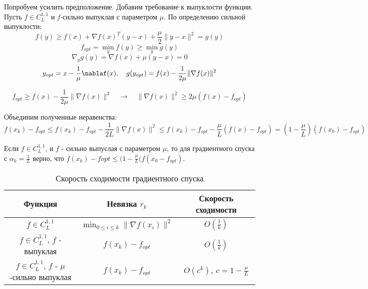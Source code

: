 \documentclass[a4paper, 12pt]{article}
\begin{document}
Попробуем усилить предположение. Добавим требование к выпуклости функции. Пусть $ f \in C^{1,1}_L$ и $f$-сильно выпуклая с параметром $\mu$. По определению сильной выпуклости:
$$ f(y) \geq f(x) + \nabla f(x)^T (y - x) + \frac{\mu}{2}\| y - x \|^2 = g(y)$$
$$f_{opt} = \min_y f(y) \geq \min_y g(y) $$
$$\nabla_y g(y) = \nabla f(x) + \mu(y - x) = 0$$
$$y_{opt} = x - \frac{1}{\mu}\nablaf(x), \quad g(y_{opt}) = f(x) - \frac{1}{2\mu} \| \nabla f(x) \|^2$$

$$f_{opt} \geq f(x) - \frac{1}{2\mu} \| \nabla f(x) \|^2 \quad \rightarrow \quad \| \nabla f(x) \|^2 \geq 2\mu(f(x) - f_{opt}) $$

Объединим полученные неравенства:
$$f(x_k) - f_{opt} \leq f(x_k) - f_{opt} - \frac{1}{2L} \| \nabla f(x) \|^2 \leq f(x_k) - f_{opt} - \frac{\mu}{L} (f(x) - f_{opt}) = (1 - \frac{\mu}{L})(f(x_0) - f_{opt})$$

\begin{Statement}
Если $ f \in C^{1,1}_L$, и $f$ - сильно выпуслая с параметром $\mu$, то для градиентного спуска с $\alpha_k = \frac{1}{L}$ верно, что $f(x_k) - f{opt} \leq (1 - \frac{\mu}{L}(f(x_0 - f_{opt})$.
\end{Statement}

\begin{table}[h]
    \centering
    \begin{tabular}{|c|c|c|} 
        \hline
        Функция & Невязка $r_k$ & Скорость сходимости\\
        \hline
        \hline
        $f \in C^{1,1}_L $ & $\min_{0\leq i \leq k}\|\nabla f(x_i)\|^2$& $O(\frac{1}{k})$\\
        \hline
        $f \in C^{1,1}_L$, $f$ - выпуклая & $f(x_k) - f_{opt}$& $O(\frac{1}{k})$\\
        \hline
        $f \in C^{1,1}_L$, $f$ - $\mu$-сильно выпуклая & $f(x_k) - f_{opt}$& $O(c^k),\: c = 1 - \frac{\mu}{L}$\\
        \hline
    \end{tabular}
    \caption{Скорость сходимости градиентного спуска}
\end{table}
\end{document}
